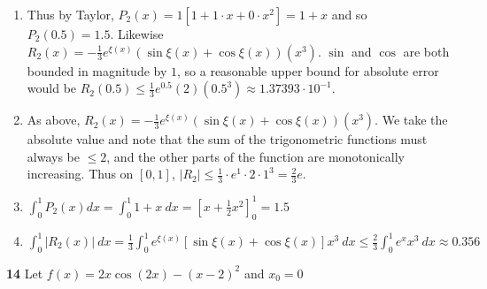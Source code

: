 \documentclass{article}
\newcommand{\abs}[1]{\left| #1 \right|}
\newcommand{\brac}[1]{\left[ #1 \right]}
\newcommand{\paren}[1]{\left( #1 \right)}
\begin{document}
\begin{enumerate}
    \item %
    Thus by Taylor, $P_2(x) = 1\brac{1 + 1\cdot x + 0\cdot x^2} = 1 + x$ and so $P_2(0.5) = 1.5$. Likewise $R_2(x) = -\frac{1}{3}e^{\xi(x)}\paren{\sin\xi(x) + \cos\xi(x)}(x^3)$. $\sin$ and $\cos$ are both bounded in magnitude by $1$, so a reasonable upper bound for absolute error would be $R_2(0.5) \le \frac{1}{3}e^0.5(2)(0.5^3) \approx 1.37393 \cdot 10^{-1}$.

    \item
    As above, $R_2(x) = -\frac{1}{3}e^{\xi(x)}\paren{\sin\xi(x) + \cos\xi(x)}(x^3)$. We take the absolute value and note that the sum of the trigonometric functions must always be $\le 2$, and the other parts of the function are monotonically increasing. Thus on $[0, 1]$, $\abs{R_2} \le \frac{1}{3} \cdot e^{1} \cdot 2 \cdot 1^3 = \frac{2}{3}e$.

    \item
    $\int_{0}^{1} P_2(x) dx = \int_{0}^{1} 1 + x \: dx = \brac{x + \frac{1}{2}x^2}_{0}^1 = 1.5$

    \item
    $\int_{0}^{1} \abs{R_2(x)} \: dx = \frac{1}{3}\int_{0}^{1} e^{\xi(x)}\brac{\sin\xi(x) + \cos\xi(x)} x^3 \: dx \le \frac{2}{3}\int_{0}^{1}e^{x} x^3 \: dx \approx 0.356$
\end{enumerate}


\textbf{14} %
Let $f(x) = 2x \cos(2x) - (x - 2)^2$ and $x_0 = 0$
\end{document}

